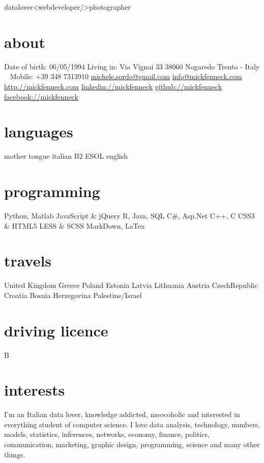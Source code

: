 \documentclass[]{friggeri-cv}
\begin{document}
       {datalover<webdeveloper/>photographer}


\begin{aside}
  \section{about}
    Date of birth:
    06/05/1994
    Living in:
    Via Vignai 33
    38060 Nogaredo
    Trento - Italy
    ~
    Mobile: +39 348 7313910
    \href{mailto:michele.sordo@gmail.com}{michele.sordo@gmail.com}
    \href{mailto:info@mickfenneck.com}{info@mickfenneck.com}
    \href{http://mickfenneck.com}{http://mickfenneck.com}
    \href{http://linkedin.com/in/mickfenneck}{linkedin://mickfenneck}
    \href{http://github.com/mickfenneck}{github://mickfenneck}
    \href{http://facebook.com/mickfenneck}{facebook://mickfenneck}
  \section{languages}
    mother tongue italian
    B2 ESOL english
  \section{programming}
    Python, Matlab
    JavaScript \& jQuery
    R, Java, SQL
    C\#, Asp.Net
    C++, C
    CSS3 \& HTML5
    LESS \& SCSS
    MarkDown, LaTex
\section{travels}
    United Kingdom
    Greece
    Poland
    Estonia
    Latvia
    Lithuania
    Austria
    CzechRepublic
    Croatia
    Bosnia Herzegovina
    Palestine/Israel
\section{driving licence}
    B
\end{aside}






\section{interests}

I'm an Italian data lover, knowledge addicted, moocoholic and interested in everything student of computer science.
I love data analysis, technology, numbers, models, statistics, inferences, networks, economy, finance, politics, communication, marketing, graphic design, programming, science and many other things.
\end{document}
